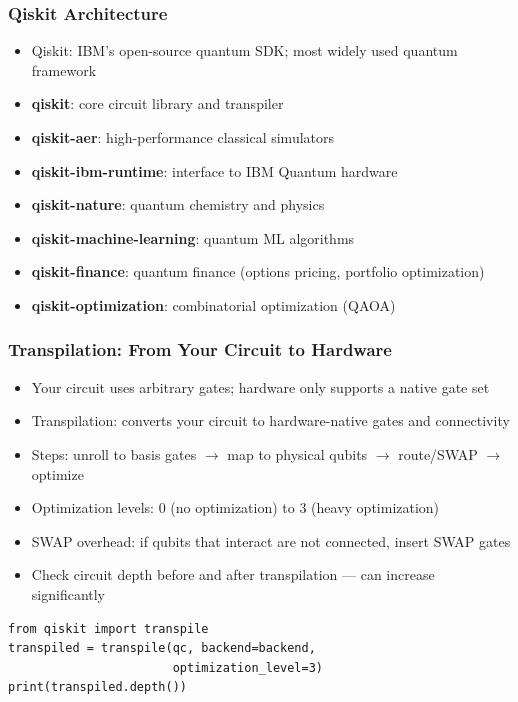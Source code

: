 \begin{frame}[fragile]\frametitle{Qiskit Architecture}
\begin{itemize}
\item Qiskit: IBM's open-source quantum SDK; most widely used quantum framework
\item \textbf{qiskit}: core circuit library and transpiler
\item \textbf{qiskit-aer}: high-performance classical simulators
\item \textbf{qiskit-ibm-runtime}: interface to IBM Quantum hardware
\item \textbf{qiskit-nature}: quantum chemistry and physics
\item \textbf{qiskit-machine-learning}: quantum ML algorithms
\item \textbf{qiskit-finance}: quantum finance (options pricing, portfolio optimization)
\item \textbf{qiskit-optimization}: combinatorial optimization (QAOA)
\end{itemize}
\end{frame}

\begin{frame}[fragile]\frametitle{Transpilation: From Your Circuit to Hardware}
\begin{itemize}
\item Your circuit uses arbitrary gates; hardware only supports a native gate set
\item Transpilation: converts your circuit to hardware-native gates and connectivity
\item Steps: unroll to basis gates $\to$ map to physical qubits $\to$ route/SWAP $\to$ optimize
\item Optimization levels: 0 (no optimization) to 3 (heavy optimization)
\item SWAP overhead: if qubits that interact are not connected, insert SWAP gates
\item Check circuit depth before and after transpilation --- can increase significantly
\end{itemize}
\begin{verbatim}
from qiskit import transpile
transpiled = transpile(qc, backend=backend,
                       optimization_level=3)
print(transpiled.depth())
\end{verbatim}
\end{frame}

